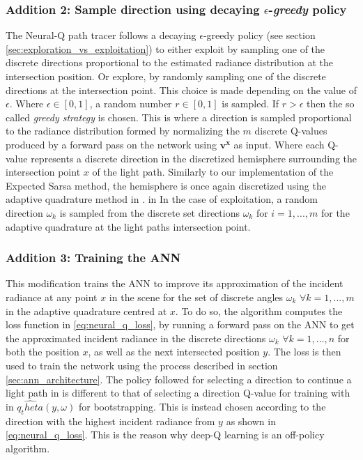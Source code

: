 \documentclass[../dissertation.tex]{subfiles}
\begin{document}
\subsubsection*{Addition 2: Sample direction using decaying $\epsilon$-\textit{greedy} policy}
The Neural-Q path tracer follows a decaying $\epsilon$-greedy policy (see section \ref{sec:exploration_vs_exploitation}) to either exploit by sampling one of the discrete directions  proportional to the estimated radiance distribution at the intersection position. Or explore, by randomly sampling one of the discrete directions at the intersection point. This choice is made depending on the value of $\epsilon$. Where $\epsilon \in [0,1]$, a random number $r \in [0,1]$ is sampled. If $r > \epsilon$ then the so called \textit{greedy strategy} is chosen. This is where a direction is sampled proportional to the radiance distribution formed by normalizing the $m$ discrete Q-values produced by a forward pass on the network using $\mathbf{v^x}$ as input. Where each Q-value represents a discrete direction in the discretized hemisphere surrounding the intersection point $x$ of the light path. Similarly to our implementation of the  Expected Sarsa method, the hemisphere is once again discretized using the adaptive quadrature method in \cite{shirley1994notes}. in In the case of exploitation, a random direction $\omega_k$ is sampled from the discrete set directions $\omega_k$ for $i = 1,...,m$ for the adaptive quadrature at the light paths intersection point. 

\subsubsection*{Addition 3: Training the ANN}
This modification trains the ANN to improve its approximation of the incident radiance at any point $x$ in the scene for the set of discrete angles $\omega_k$ $\forall k= 1,...,m$ in the adaptive quadrature centred at $x$. To do so, the algorithm computes the loss function in \ref{eq:neural_q_loss}, by running a forward pass on the ANN to get the approximated incident radiance in the discrete directions $\omega_k$ $\forall k=1,...,n$ for both the position $x$, as well as the next intersected position $y$. The loss is then used to train the network using the process described in section \ref{sec:ann_architecture}. The policy followed for selecting a direction to continue a light path in is different to that of selecting a direction Q-value for training with in $\hat{q_theta}(y, \omega)$ for bootstrapping. This is instead chosen according to the direction with the highest incident radiance from $y$ as shown in \ref{eq:neural_q_loss}. This is the reason why deep-Q learning is an off-policy algorithm.\\ 
\end{document}

